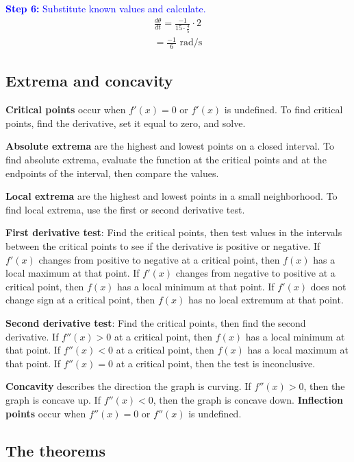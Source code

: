 \documentclass[letterpaper, 12pt]{article}
\newcommand{\step}[2]{\textcolor{blue}{\textbf{Step #1:} #2}}
\begin{document}
\step{6}{Substitute known values and calculate.}
\begin{gather*}
\frac{d\theta}{dt} = \frac{-1}{15 \cdot \frac{4}{5}} \cdot 2 \\ = \boxed{\frac{-1}{6} \text{ rad/s}}
\end{gather*}

\subsection*{Extrema and concavity}

\textbf{Critical points} occur when $f'(x) = 0$ or $f'(x)$ is undefined. To find critical points, find the derivative, set it equal to zero, and solve.

\textbf{Absolute extrema} are the highest and lowest points on a closed interval. To find absolute extrema, evaluate the function at the critical points and at the endpoints of the interval, then compare the values.

\textbf{Local extrema} are the highest and lowest points in a small neighborhood. To find local extrema, use the first or second derivative test.

\textbf{First derivative test}: Find the critical points, then test values in the intervals between the critical points to see if the derivative is positive or negative. If $f'(x)$ changes from positive to negative at a critical point, then $f(x)$ has a local maximum at that point. If $f'(x)$ changes from negative to positive at a critical point, then $f(x)$ has a local minimum at that point. If $f'(x)$ does not change sign at a critical point, then $f(x)$ has no local extremum at that point.

\textbf{Second derivative test}: Find the critical points, then find the second derivative. If $f''(x) > 0$ at a critical point, then $f(x)$ has a local minimum at that point. If $f''(x) < 0$ at a critical point, then $f(x)$ has a local maximum at that point. If $f''(x) = 0$ at a critical point, then the test is inconclusive.

\textbf{Concavity} describes the direction the graph is curving. If $f''(x) > 0$, then the graph is concave up. If $f''(x) < 0$, then the graph is concave down. \textbf{Inflection points} occur when $f''(x) = 0$ or $f''(x)$ is undefined. 

\subsection*{The theorems}
\end{document}
